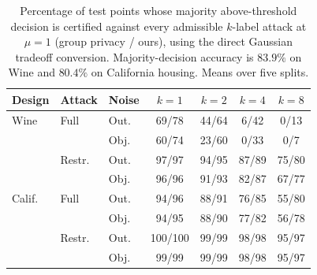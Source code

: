 \begin{table}[t]
\centering
\caption{Percentage of test points whose majority above-threshold decision is certified against every admissible $k$-label attack at $\mu=1$ (group privacy / ours), using the direct Gaussian tradeoff conversion. Majority-decision accuracy is $83.9\%$ on Wine and $80.4\%$ on California housing. Means over five splits.}
\label{tab:downstream}
\footnotesize
\setlength{\tabcolsep}{3pt}
\begin{tabular}{lllcccc}
\toprule
Design & Attack & Noise & $k=1$ & $k=2$ & $k=4$ & $k=8$ \\
\midrule
Wine & Full & Out. & 69/78 & 44/64 & 6/42 & 0/13 \\
 &  & Obj. & 60/74 & 23/60 & 0/33 & 0/7 \\
 & Restr. & Out. & 97/97 & 94/95 & 87/89 & 75/80 \\
 &  & Obj. & 96/96 & 91/93 & 82/87 & 67/77 \\
\midrule
Calif. & Full & Out. & 94/96 & 88/91 & 76/85 & 55/80 \\
 &  & Obj. & 94/95 & 88/90 & 77/82 & 56/78 \\
 & Restr. & Out. & 100/100 & 99/99 & 98/98 & 95/97 \\
 &  & Obj. & 99/99 & 99/99 & 98/98 & 95/97 \\
\bottomrule
\end{tabular}
\end{table}
